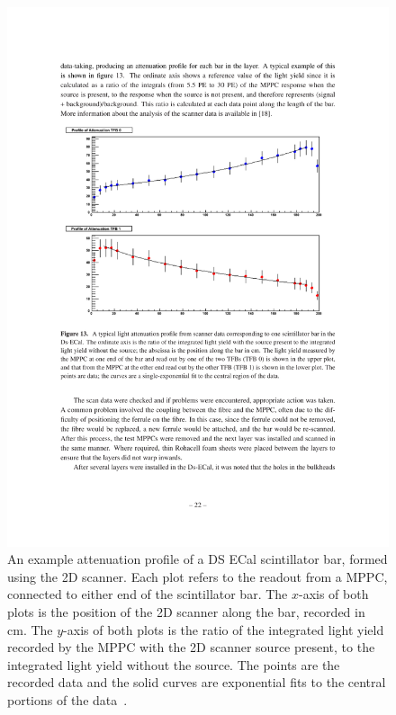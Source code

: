 \begin{figure}[t!]
  \centering
  \includegraphics[width=14cm]{images/t2k/DSECal_Bar_Attenuation_Profile.pdf}
  \caption{An example attenuation profile of a DS ECal scintillator bar, formed using the 2D scanner.  Each plot refers to the readout from a MPPC, connected to either end of the scintillator bar.  The $x$-axis of both plots is the position of the 2D scanner along the bar, recorded in cm.  The $y$-axis of both plots is the ratio of the integrated light yield recorded by the MPPC with the 2D scanner source present, to the integrated light yield without the source.  The points are the recorded data and the solid curves are exponential fits to the central portions of the data~\cite{1748-0221-8-10-P10019}.}
  \label{fig:DSECalBarAttenuationProfile}
\end{figure}
\newline
\newline
